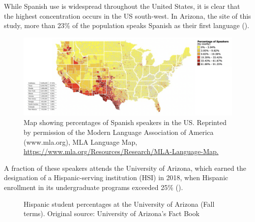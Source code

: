 \documentclass[output=paper]{../langscibook}
\begin{document}
\clearpage
While Spanish use is widespread throughout the United States, it is clear that the highest concentration occurs in the US south-west. In Arizona, the site of this study, more than 23\% of the population speaks Spanish as their first language ().

\begin{figure}
  \includegraphics[width=\textwidth]{figures/Chapter3-img003.png}
  \caption{Map showing percentages of Spanish speakers in the US.  Reprinted by permission of the Modern
Language Association of America (www.mla.org), MLA Language Map, \url{https://www.mla.org/Resources/Research/MLA-Language-Map.}}
  \label{fig:3:3}
\end{figure}


A fraction of these speakers attends the University of Arizona, which earned the designation of a Hispanic-serving institution (HSI) in 2018, when Hispanic enrollment in its undergraduate programs exceeded 25\% ().

  
 

\begin{figure}
\footnotesize
  \caption{Hispanic student percentages at the University of Arizona (Fall terms). Original source: University of Arizona's Fact Book}
    \label{fig:3:4}
\end{figure}
\end{document}
